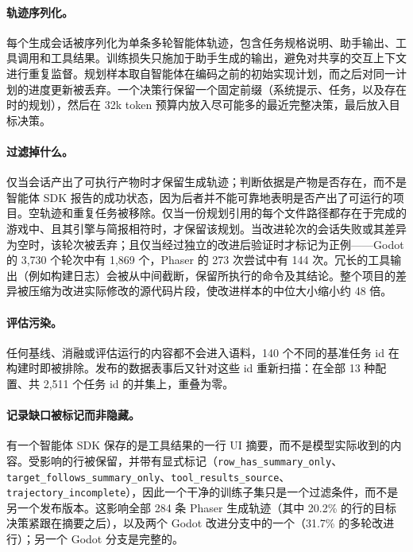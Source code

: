 \paragraph{轨迹序列化。}每个生成会话被序列化为单条多轮智能体轨迹，包含任务规格说明、助手输出、工具调用和工具结果。训练损失只施加于助手生成的输出，避免对共享的交互上下文进行重复监督。规划样本取自智能体在编码之前的初始实现计划，而之后对同一计划的进度更新被丢弃。一个决策行保留一个固定前缀（系统提示、任务，以及存在时的规划），然后在 32k token 预算内放入尽可能多的最近完整决策，最后放入目标决策。

\paragraph{过滤掉什么。}仅当会话产出了可执行产物时才保留生成轨迹；判断依据是产物是否存在，而不是智能体 SDK 报告的成功状态，因为后者并不能可靠地表明是否产出了可运行的项目。空轨迹和重复任务被移除。仅当一份规划引用的每个文件路径都存在于完成的游戏中、且其引擎与简报相符时，才保留该规划。当改进轮次的会话失败或其差异为空时，该轮次被丢弃；且仅当经过独立的改进后验证时才标记为正例——Godot 的 3,730 个轮次中有 1,869 个，Phaser 的 273 次尝试中有 144 次。冗长的工具输出（例如构建日志）会被从中间截断，保留所执行的命令及其结论。整个项目的差异被压缩为改进实际修改的源代码片段，使改进样本的中位大小缩小约 48 倍。

\paragraph{评估污染。}任何基线、消融或评估运行的内容都不会进入语料，140 个不同的基准任务 id 在构建时即被排除。发布的数据表事后又针对这些 id 重新扫描：在全部 13 种配置、共 2,511 个任务 id 的并集上，重叠为零。

\paragraph{记录缺口被标记而非隐藏。}有一个智能体 SDK 保存的是工具结果的一行 UI 摘要，而不是模型实际收到的内容。受影响的行被保留，并带有显式标记（{\small\texttt{row\_has\_summary\_only}、\texttt{target\_follows\_summary\_only}、\linebreak\texttt{tool\_results\_source}、\texttt{trajectory\_incomplete}}），因此一个干净的训练子集只是一个过滤条件，而不是另一个发布版本。这影响全部 284 条 Phaser 生成轨迹（其中 20.2\% 的行的目标决策紧跟在摘要之后），以及两个 Godot 改进分支中的一个（31.7\% 的多轮改进行）；另一个 Godot 分支是完整的。

